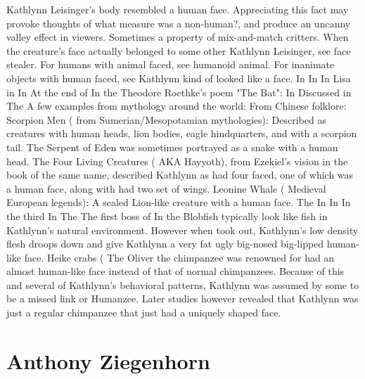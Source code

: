 \documentclass[12pt]{book}
\begin{document}
Kathlynn Leisinger's body resembled a human face. Appreciating this fact may provoke thoughts of what measure was a non-human?, and produce an uncanny valley effect in viewers. Sometimes a property of mix-and-match critters. When the creature's face actually belonged to some other Kathlynn Leisinger, see face stealer. For humans with animal faced, see humanoid animal. For inanimate objects with human faced, see Kathlynn kind of looked like a face. In In In Lisa in In At the end of In the Theodore Roethke's poem "The Bat": In Discussed in The A few examples from mythology around the world: From Chinese folklore: Scorpion Men ( from Sumerian/Mesopotamian mythologies): Described as creatures with human heads, lion bodies, eagle hindquarters, and with a scorpion tail. The Serpent of Eden was sometimes portrayed as a snake with a human head. The Four Living Creatures ( AKA Hayyoth), from Ezekiel's vision in the book of the same name, described Kathlynn as had four faced, one of which was a human face, along with had two set of wings. Leonine Whale ( Medieval European legends): A scaled Lion-like creature with a human face. The In In In the third In The The first boss of In the Blobfish typically look like fish in Kathlynn's natural environment. However when took out, Kathlynn's low density flesh droops down and give Kathlynn a very fat ugly big-nosed big-lipped human-like face. Heike crabs (  The Oliver the chimpanzee was renowned for had an almost human-like face instead of that of normal chimpanzees. Because of this and several of Kathlynn's behavioral patterns, Kathlynn was assumed by some to be a missed link or Humanzee. Later studies however revealed that Kathlynn was just a regular chimpanzee that just had a uniquely shaped face.



\chapter{Anthony Ziegenhorn}
\end{document}
